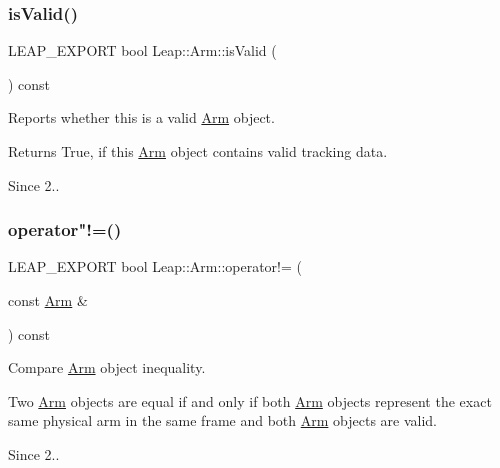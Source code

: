 \subsubsection{\texorpdfstring{is\+Valid()}{isValid()}}
{\footnotesize\ttfamily L\+E\+A\+P\+\_\+\+E\+X\+P\+O\+RT bool Leap\+::\+Arm\+::is\+Valid (\begin{DoxyParamCaption}{ }\end{DoxyParamCaption}) const}

Reports whether this is a valid \hyperlink{class_leap_1_1_arm}{Arm} object.


\begin{DoxyCodeInclude}
\end{DoxyCodeInclude}


\begin{DoxyReturn}{Returns}
True, if this \hyperlink{class_leap_1_1_arm}{Arm} object contains valid tracking data. 
\end{DoxyReturn}
\begin{DoxySince}{Since}
2.. 
\end{DoxySince}
\mbox{\label{class_leap_1_1_arm_a99089dc7d5792f516a6529aa25436c84}} 
\subsubsection{\texorpdfstring{operator"!=()}{operator!=()}}
{\footnotesize\ttfamily L\+E\+A\+P\+\_\+\+E\+X\+P\+O\+RT bool Leap\+::\+Arm\+::operator!= (\begin{DoxyParamCaption}\item[{const \hyperlink{class_leap_1_1_arm}{Arm} \&}]{ }\end{DoxyParamCaption}) const}

Compare \hyperlink{class_leap_1_1_arm}{Arm} object inequality.


\begin{DoxyCodeInclude}
\end{DoxyCodeInclude}


Two \hyperlink{class_leap_1_1_arm}{Arm} objects are equal if and only if both \hyperlink{class_leap_1_1_arm}{Arm} objects represent the exact same physical arm in the same frame and both \hyperlink{class_leap_1_1_arm}{Arm} objects are valid. \begin{DoxySince}{Since}
2.. 
\end{DoxySince}
\mbox{\label{class_leap_1_1_arm_aa70ba8d8ff413608e9dee638c1f04f46}} 
